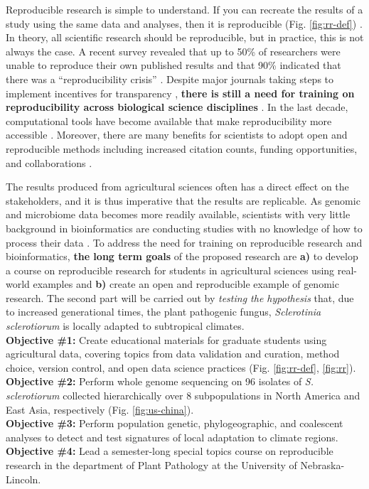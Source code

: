 \documentclass[12pt,letterpaper]{article}
\begin{document}
Reproducible research is simple to understand. 
If you can recreate the results of a study using the same data and analyses, then it is reproducible (Fig. \ref{fig:rr-def}) \citep{buckheit1995wavelab,peng2011reproducible,patil2016statistical}. 
In theory, all scientific research should be reproducible, but in practice, this is not always the case.
A recent survey revealed that up to 50\% of researchers were unable to reproduce their own published results and that 90\% indicated that there was a ``reproducibility crisis'' \citep{baker2016scientists}.
Despite major journals taking steps to implement incentives for transparency \citep{nature2017announcement}, \textbf{there is still a need for training on reproducibility across biological science disciplines} \citep{barone2017unmet}.
In the last decade, computational tools have become available that make reproducibility more accessible \citep{boettiger2015introduction,wilson2016good}.
Moreover, there are many benefits for scientists to adopt open and reproducible methods including increased citation counts, funding opportunities, and collaborations \citep{mckiernan2016open,stewart-lowndes2017path,schmidt2016stepping}.

The results produced from agricultural sciences often has a direct effect on the stakeholders, and it is thus imperative that the results are replicable. 
As genomic and microbiome data becomes more readily available, scientists with very little background in bioinformatics are conducting studies with no knowledge of how to process their data \citep{stewart-lowndes2017path, barone2017unmet}. 
To address the need for training on reproducible research and bioinformatics, \textbf{the long term goals} of the proposed research are \textbf{a)} to develop a course on reproducible research for students in agricultural sciences using real-world examples and \textbf{b)} create an open and reproducible example of genomic research. The second part will be carried out by \textit{testing the hypothesis} that, due to increased generational times, the plant pathogenic fungus, \textit{Sclerotinia sclerotiorum} is locally adapted to subtropical climates.\\
\textbf{Objective \#1:} Create educational materials for graduate students using agricultural data, covering topics from data validation and curation, method choice, version control, and open data science practices (Fig. \ref{fig:rr-def}, \ref{fig:rr}).\\
\textbf{Objective \#2:} Perform whole genome sequencing on 96 isolates of \textit{S. sclerotiorum} collected hierarchically over 8 subpopulations in North America and East Asia, respectively (Fig. \ref{fig:us-china}).\\
\textbf{Objective \#3:} Perform population genetic, phylogeographic, and coalescent analyses to detect and test signatures of local adaptation to climate regions.\\
\textbf{Objective \#4:} Lead a semester-long special topics course on reproducible research in the department of Plant Pathology at the University of Nebraska-Lincoln.
\end{document}
